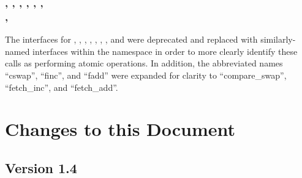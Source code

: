 \subsection{, , ,
  , , , \\
  , }

The \CorCpp interfaces for , ,
, , , ,
, and  were deprecated and replaced with
similarly-named interfaces within the  namespace
in order to more clearly identify these calls as performing atomic operations.
In addition, the abbreviated names ``cswap'', ``finc'', and ``fadd'' were
expanded for clarity to ``compare\_swap'', ``fetch\_inc'', and ``fetch\_add''.






\chapter{Changes to this Document}\label{sec:changelog}

\section{Version 1.4}

